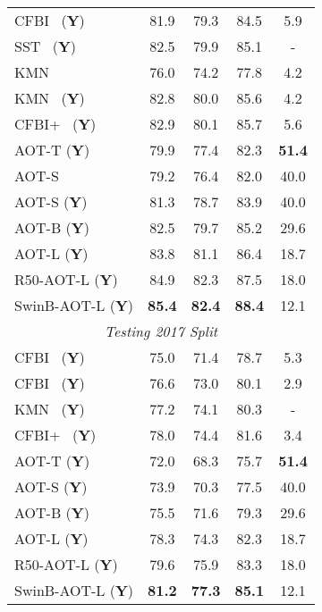\documentclass{article}
\begin{document}
\begin{table}[t!]
\begin{subtable}[t]{.45\textwidth}
\begin{center}
\begin{tabular}{l c c c c}
CFBI~\cite{cfbi} (\textbf{Y}) &  81.9  & 79.3  & 84.5 & 5.9 \\
SST~\cite{sstvos} (\textbf{Y}) &  82.5  & 79.9  & 85.1 & - \\
KMN~\cite{KMN}  &  76.0  & 74.2  & 77.8 & 4.2 \\
KMN~\cite{KMN} (\textbf{Y}) &  82.8  & 80.0  & 85.6 & 4.2 \\
\vspace{0.65mm}
CFBI+~\cite{cfbip} (\textbf{Y}) &  82.9  & 80.1  & 85.7 & 5.6 \\
\hline
AOT-T (\textbf{Y}) & 79.9 & 77.4 & 82.3 & \textbf{51.4} \\
AOT-S  &  79.2  & 76.4 & 82.0 & 40.0 \\
AOT-S (\textbf{Y}) & 81.3 & 78.7 & 83.9 & {40.0} \\
AOT-B (\textbf{Y}) & 82.5 & 79.7 & 85.2 & 29.6 \\
AOT-L (\textbf{Y}) & {83.8} & {81.1} & {86.4} & 18.7 \\
R50-AOT-L (\textbf{Y}) & {84.9} & {82.3} & {87.5} & 18.0 \\
SwinB-AOT-L (\textbf{Y}) & \textbf{85.4} & \textbf{82.4} & \textbf{88.4} & 12.1 \\
\midrule[1pt]
\multicolumn{5}{c}{\textit{Testing 2017 Split}} \\
\midrule[1pt]
CFBI~\cite{cfbi} (\textbf{Y}) &  75.0  & 71.4  & 78.7 & 5.3 \\
CFBI~\cite{cfbi} (\textbf{Y}) &  76.6  & 73.0  & 80.1 & 2.9 \\
KMN~\cite{KMN} (\textbf{Y})  &  77.2  & 74.1  & 80.3 & - \\
\vspace{0.65mm}
CFBI+~\cite{cfbip} (\textbf{Y}) &  78.0  & 74.4  & 81.6 & 3.4 \\

\hline

AOT-T (\textbf{Y}) & 72.0 & 68.3 & 75.7 & \textbf{51.4} \\
AOT-S (\textbf{Y}) &  73.9  & 70.3 & 77.5 & 40.0 \\
AOT-B (\textbf{Y})  &  75.5  & 71.6 & 79.3 & 29.6 \\
AOT-L (\textbf{Y})  &  78.3  & 74.3 & 82.3 & 18.7 \\
R50-AOT-L (\textbf{Y}) & {79.6} & {75.9} & {83.3} & 18.0 \\
SwinB-AOT-L (\textbf{Y}) & \textbf{81.2} & \textbf{77.3} & \textbf{85.1} & 12.1 \\

\bottomrule[1.5pt]

\end{tabular}
\end{center}

\end{subtable}

\end{table}
\end{document}
